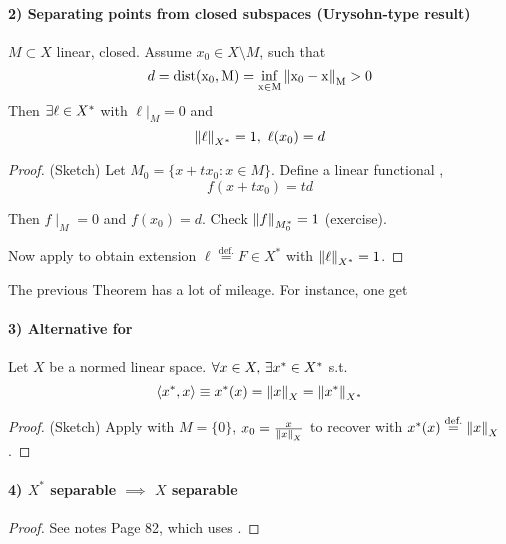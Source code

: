 \documentclass{article}
\begin{document}
\paragraph{2) Separating points from closed subspaces (Urysohn-type result)}

\begin{theorem}
\label{analog of Urysohn}
$M \subset X$ linear, closed. Assume $x_0 \in X\setminus M$, such that  
$$d = \rm{dist} (x_0, M) = \inf_{x \in M} \left\|{x_0-x}\right\|_M >0$$
Then $\exists \ell \in {X}^*$ with $\ell|_M=0$ and  
$$\left\|{\ell}\right\|_{{X}^*}=1, \  \ell(x_0)=d$$
\end{theorem}

\begin{proof}
(Sketch)
Let $M_0=\{x+t x_0: x\in M\}$. Define a linear functional , 
$$f(x+tx_0)=td$$

Then $f\mid_M=0$ and $f(x_0)=d$. Check $\left\|{f}\right\|_{M_0^*}=1$ (exercise).  

Now apply  to obtain extension $\ell \overset{\text{def.}}{=}F \in X^*$ with $\left\|{\ell}\right\|_{X^*}=1$.
\end{proof}

The previous Theorem  has a lot of mileage. For instance, one get  

\paragraph{3) Alternative for }  
\begin{proposition}
    Let $X$ be a normed linear space. $\forall x\in X,\,\exists x^*\in {X}^*$ s.t. $$\left<{{x}^*},{x}\right>\equiv{x}^*(x)=\left\|{x}\right\|_X=\left\|{{x}^*}\right\|_{{X}^*}$$
\end{proposition}
\begin{proof}
    (Sketch) Apply  with $M = \{0\}$, $x_0=\frac{x}{\left\|{x}\right\|_X}$ to recover  with $x^*(x) \stackrel{\text{def.}}{=} \left\|{x}\right\|_X$.
\end{proof}

\paragraph{4) $X^*$ separable $\implies$ $X$ separable}  
\begin{proof}
    See notes Page 82, which uses .
\end{proof}
\end{document}
